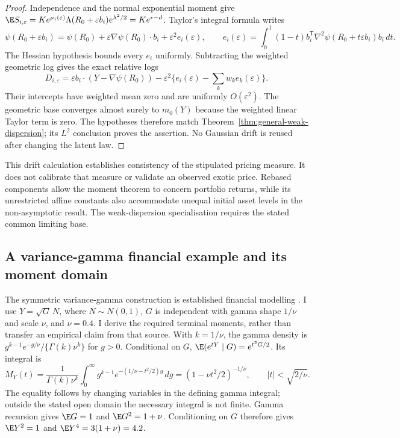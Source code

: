 \begin{proof}
Independence and the normal exponential moment give
$\E S_{i,\varepsilon}
=Ke^{\mu_i(\varepsilon)}\Lambda(R_0+\varepsilon b_i)
e^{\lambda^2/2}=Ke^{r-d}$.
Taylor's integral formula writes
\begin{equation}
 \psi(R_0+\varepsilon b_i)
 =\psi(R_0)+\varepsilon\nabla\psi(R_0)\cdot b_i
       +\varepsilon^2 e_i(\varepsilon),\qquad
 e_i(\varepsilon)=\int_0^1(1-t)
 b_i^{\mathsf T}\nabla^2\psi(R_0+t\varepsilon b_i)b_i\,dt.
\end{equation}
The Hessian hypothesis bounds every $e_i$ uniformly. Subtracting the
weighted geometric log gives the exact relative logs
\begin{equation}
 D_{i,\varepsilon}
 =\varepsilon b_i\cdot(Y-\nabla\psi(R_0))
 -\varepsilon^2\{e_i(\varepsilon)-\sum_kw_ke_k(\varepsilon)\}.
\end{equation}
Their intercepts have weighted mean zero and are uniformly
$O(\varepsilon^2)$. The geometric base converges almost surely to
$m_0(Y)$ because the weighted linear Taylor term is zero.
The hypotheses therefore match
Theorem~\ref{thm:general-weak-dispersion}; its $L^2$ conclusion proves
the assertion. No Gaussian drift is reused after changing the latent law.
\end{proof}

This drift calculation establishes consistency of the stipulated pricing
measure. It does not calibrate that measure or validate an observed exotic
price. Rebased components allow the moment theorem to concern portfolio
returns, while its unrestricted affine constants also accommodate unequal
initial asset levels in the non-asymptotic result. The weak-dispersion
specialisation requires the stated common limiting base.

\subsection{A variance-gamma financial example and its moment domain}

The symmetric variance-gamma construction is established financial
modelling \citep{madan}. I use $Y=\sqrt G\,N$, where $N\sim N(0,1)$,
$G$ is independent with gamma shape $1/\nu$ and scale $\nu$, and
$\nu=0.4$. I derive the required terminal moments, rather than transfer
an empirical claim from that source. With $k=1/\nu$, the gamma density is
$g^{k-1}e^{-g/\nu}/\{\Gamma(k)\nu^k\}$ for $g>0$. Conditional on $G$,
$\E(e^{tY}\mid G)=e^{t^2G/2}$. Its integral is
\begin{equation}
 M_Y(t)=\frac1{\Gamma(k)\nu^k}
 \int_0^\infty g^{k-1}e^{-(1/\nu-t^2/2)g}\,dg
 =(1-\nu t^2/2)^{-1/\nu},\qquad |t|<\sqrt{2/\nu}.
\end{equation}
The equality follows by changing variables in the defining gamma
integral; outside the stated open domain the necessary integral is
not finite. Gamma recursion gives $\E G=1$ and
$\E G^2=1+\nu$. Conditioning on $G$ therefore gives
$\E Y^2=1$ and $\E Y^4=3(1+\nu)=4.2$.


